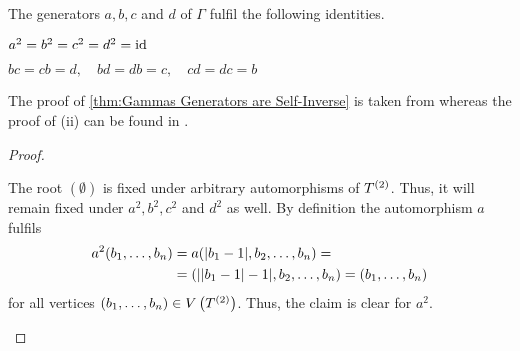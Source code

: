 \begin{thm}\label{thm:Relations of the generators of Gamma}
The generators $a,b,c$ and $d$ of $\Gamma$ fulfil the following identities.
\begin{thmlist}
\item $a^2=b^2=c^2=d^2=\operatorname{id}$\label{thm:Gammas Generators are Self-Inverse}
\item $bc=cb=d,\quad bd=db=c,\quad cd=dc=b$\label{thm:Three Generators Suffice}
\end{thmlist}
\end{thm}

The proof of \cref{thm:Gammas Generators are Self-Inverse} is taken from \cite{hudec2006burnside} whereas the proof of (ii) can be found in \cite{waddle2008grigorchuk}.

\begin{proof}
\begin{plist}
\item The root $(\emptyset)$ is fixed under arbitrary automorphisms of $T^{(2)}$. Thus, it will remain fixed under $a^2,b^2,c^2$ and $d^2$ as well. By definition the automorphism $a$ fulfils
\begin{align*}
a^2(b_{1},\ldots,b_{n})	&=a(\lvert b_1-1\rvert,b_2,\ldots,b_n)=\\
			&=(\lvert\lvert b_1-1\rvert-1\rvert,b_2,\ldots,b_n)=(b_{1},\ldots,b_{n})
\end{align*}
for all vertices $(b_{1},\ldots,b_{n})\in V\left(T^{(2)}\right)$. Thus, the claim is clear for $a^2.$


\end{plist}
\end{proof}
